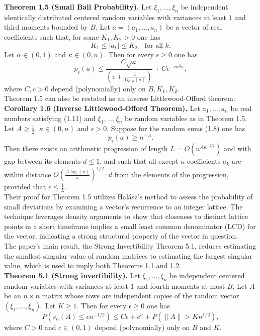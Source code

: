\textbf{Theorem 1.5 (Small Ball Probability).} Let \(\xi_1, \ldots, \xi_n\) be independent identically distributed centered random variables with variances at least \(1\) and third moments bounded by \(B\). Let \(a = (a_1, \ldots, a_n)\) be a vector of real coefficients such that, for some \(K_1, K_2 > 0\) one has
\[K_1 \leq |a_k| \leq K_2 \quad \text{for all } k.\]
Let \(\alpha \in (0, 1)\) and \(\kappa \in (0, n)\). Then for every \(\epsilon \geq 0\) one has
\[p_{\epsilon}(a) \leq \frac{C\sqrt{\kappa}}{\left(\epsilon + \frac{1}{D_{\alpha,\kappa}(a)}\right)} + C e^{-c\alpha^2\kappa},\]
where \(C, c > 0\) depend (polynomially) only on \(B, K_1, K_2\).\\

Theorem 1.5 can also be restated as an inverse Littlewood-Offord theorem:\\

\textbf{Corollary 1.6 (Inverse Littlewood-Offord Theorem).} Let \(a_1, \ldots, a_n\) be real numbers satisfying (1.11) and \(\xi_1, \ldots, \xi_n\) be random variables as in Theorem 1.5. Let \(A \geq \frac{1}{2}\), \(\kappa \in (0, n)\) and \(\epsilon > 0\). Suppose for the random sums (1.8) one has
\[p_\epsilon(a) \geq n^{-A}.\]
Then there exists an arithmetic progression of length \(L = O(n^{A\kappa^{-1/2}})\) and with gap between its elements \(d \leq 1\), and such that all except \(\kappa\) coefficients \(a_k\) are within distance \(O\left(\frac{A \log(n)}{\kappa}\right)^{1/2} \cdot d\) from the elements of the progression, provided that \(\epsilon \leq \frac{1}{L}\).\\

Their proof for Theorem 1.5 utilizes Halász's method to assess the probability of small deviations by examining a vector's recurrence to an integer lattice. The technique leverages density arguments to show that closeness to distinct lattice points in a short timeframe implies a small least common denominator (LCD) for the vector, indicating a strong structural property of the vector in question.\\

The paper's main result, the Strong Invertibility Theorem 5.1, reduces estimating the smallest singular value of random matrices
to estimating the largest singular value, which is used to imply both Theorems 1.1 and 1.2.\\

\textbf{Theorem 5.1 (Strong invertibility).} Let \(\xi_1, \ldots, \xi_n\) be independent centered random variables with variances at least \(1\) and fourth moments at most \(B\). Let \(A\) be an \(n \times n\) matrix whose rows are independent copies of the random vector \((\xi_1, \ldots, \xi_n)\). Let \(K \geq 1\). Then for every \(\epsilon \geq 0\) one has
\[P(s_n(A) \leq \epsilon n^{-1/2}) \leq C\epsilon + c^n + P(\|A\| > K n^{1/2}),\]
where \(C > 0\) and \(c \in (0, 1)\) depend (polynomially) only on \(B\) and \(K\).\\

